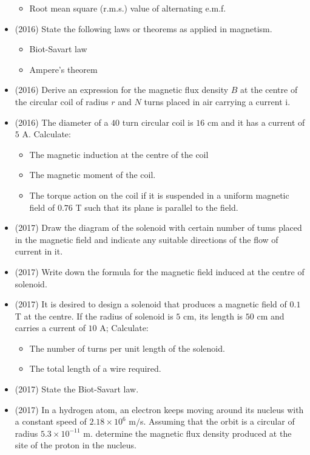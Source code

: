 \documentclass{article}
\begin{document}
\begin{itemize}
\begin{itemize}
\item  Root mean square (r.m.s.) value of alternating e.m.f.
\end{itemize}
\item (2016)  State the following laws or theorems as applied in magnetism.
 \begin{itemize}
\item Biot-Savart law
\item Ampere’s theorem
\end{itemize}
\item (2016)  Derive an expression for the magnetic flux density $ B$ at the centre of the circular coil of radius $ r$ and $ N$ turns placed in air carrying a current i.
\item (2016)  The diameter of a $ 40$ turn circular coil is $ 16$ cm and it has a current of $ 5$ A.  Calculate:
 \begin{itemize}
\item The magnetic induction at the centre of the coil
\item The magnetic moment of the coil.
\item The torque action on the coil if it is suspended in a uniform magnetic field of $ 0.76$ T such that its plane is parallel to the field.
\end{itemize}
\item (2017)  Draw the diagram of the solenoid with certain number of tums placed in the magnetic field and indicate any suitable directions of the flow of current in it.
\item (2017)  Write down the formula for the magnetic field induced at the centre of solenoid. 
\item (2017)  It is desired to design a solenoid that produces a magnetic field of $ 0.1$ T at the centre. If the radius of solenoid is $ 5$ cm, its length is $ 50$ cm and carries a current of $ 10$ A; Calculate:
 \begin{itemize}
\item The number of turns per unit length of the solenoid. 
\item The total length of a wire required. 
\end{itemize}
\item (2017)  State the Biot-Savart law. 
\item (2017)  In a hydrogen atom, an electron keeps moving around its nucleus with a constant speed of $ 2.18 \times 10^{6}$ m$/$s. Assuming that the orbit is a circular of radius $ 5.3 \times 10^{-11}$ m. determine the magnetic flux density produced at the site of the proton in the nucleus. 

\end{itemize}
\end{document}
